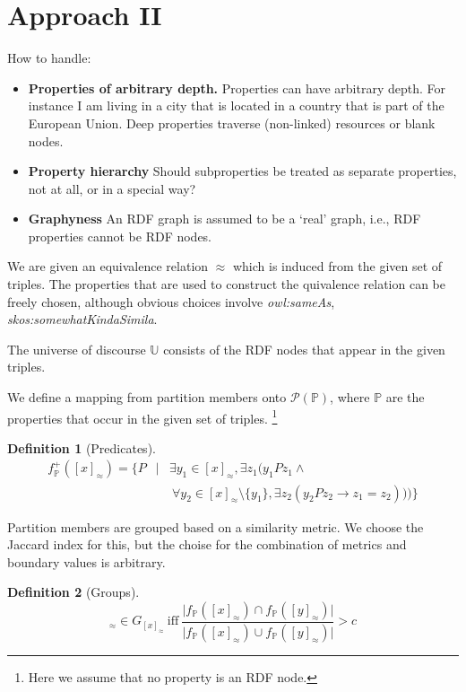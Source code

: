 \documentclass[11pt,a4paper,notitlepage,onecolumn,twoside]{article}
\newtheorem{definition}{Definition}
\begin{document}
\section{Approach II}

How to handle:
\begin{itemize}
\item \textbf{Properties of arbitrary depth.} Properties can have arbitrary
      depth. For instance I am living in a city that is located in a country
      that is part of the European Union. Deep properties traverse
      (non-linked) resources or blank nodes.
\item \textbf{Property hierarchy} Should subproperties be treated
      as separate properties, not at all, or in a special way?
\item \textbf{Graphyness} An RDF graph is assumed to be a `real' graph,
      i.e., RDF properties cannot be RDF nodes.
\end{itemize}

We are given an equivalence relation $\approx$ which is induced
from the given set of triples. The properties that are used to construct
the quivalence relation can be freely chosen, although obvious choices
involve \emph{owl:sameAs}, \emph{skos:somewhatKindaSimila}.

The universe of discourse $\mathbb{U}$ consists of the RDF nodes that appear
in the given triples.

We define a mapping from partition members onto $\mathcal{P}(\mathbb{P})$,
where $\mathbb{P}$ are the properties that occur in the given set of triples.
\footnote{Here we assume that no property is an RDF node.}

\begin{definition}[Predicates]
\begin{eqnarray}
f^{+}_{\mathbb{P}}([x]_{\approx}) = \{ P &\vert&
    \exists y_1 \in [x]_{\approx}, \exists z_1 (y_1Pz_1 \land \\
    & & \  \forall y_2 \in [x]_{\approx} \setminus \{ y_1 \},
    \exists z_2 (y_2Pz_2 \rightarrow z_1 = z_2))) \} \nonumber
\end{eqnarray}
\end{definition}

Partition members are grouped based on a similarity metric.
We choose the Jaccard index for this, but the choise for the combination
of metrics and boundary values is arbitrary.

\begin{definition}[Groups]
\begin{equation}
[y]_{\approx} \in G_{[x]_{\approx}} \  \text{iff} \ 
\frac{\vert f_{\mathbb{P}}([x]_{\approx}) \cap f_{\mathbb{P}}([y]_{\approx}) \vert}
     {\vert f_{\mathbb{P}}([x]_{\approx}) \cup f_{\mathbb{P}}([y]_{\approx}) \vert}
     > c
\end{equation}
\end{definition}
\end{document}
